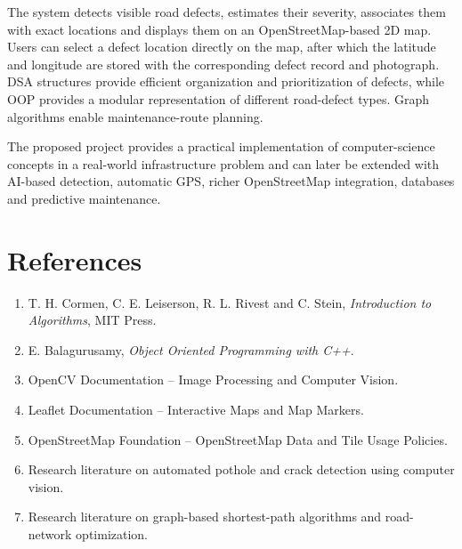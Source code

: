 \documentclass[12pt,a4paper]{article}
\begin{document}
The system detects visible road defects, estimates their severity, associates them with exact locations and displays them on an OpenStreetMap-based 2D map. Users can select a defect location directly on the map, after which the latitude and longitude are stored with the corresponding defect record and photograph. DSA structures provide efficient organization and prioritization of defects, while OOP provides a modular representation of different road-defect types. Graph algorithms enable maintenance-route planning.

The proposed project provides a practical implementation of computer-science concepts in a real-world infrastructure problem and can later be extended with AI-based detection, automatic GPS, richer OpenStreetMap integration, databases and predictive maintenance.

\section{References}

\begin{enumerate}[leftmargin=*]
    \item T. H. Cormen, C. E. Leiserson, R. L. Rivest and C. Stein, \textit{Introduction to Algorithms}, MIT Press.
    \item E. Balagurusamy, \textit{Object Oriented Programming with C++}.
    \item OpenCV Documentation -- Image Processing and Computer Vision.
    \item Leaflet Documentation -- Interactive Maps and Map Markers.
    \item OpenStreetMap Foundation -- OpenStreetMap Data and Tile Usage Policies.
    \item Research literature on automated pothole and crack detection using computer vision.
    \item Research literature on graph-based shortest-path algorithms and road-network optimization.
\end{enumerate}
\end{document}
